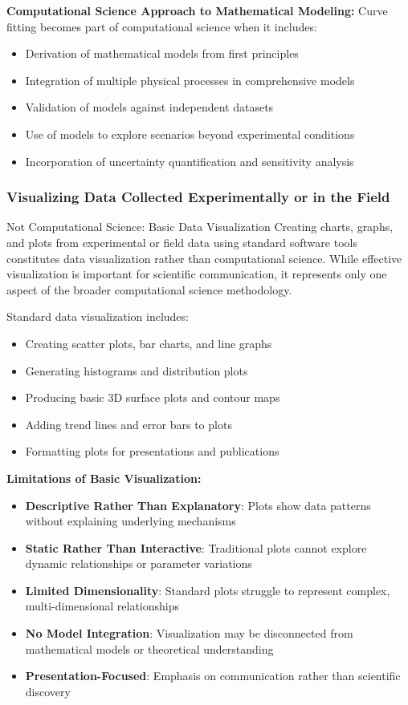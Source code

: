 \textbf{Computational Science Approach to Mathematical Modeling:}
Curve fitting becomes part of computational science when it includes:
\begin{itemize}
    \item Derivation of mathematical models from first principles
    \item Integration of multiple physical processes in comprehensive models
    \item Validation of models against independent datasets
    \item Use of models to explore scenarios beyond experimental conditions
    \item Incorporation of uncertainty quantification and sensitivity analysis
\end{itemize}

\subsubsection{Visualizing Data Collected Experimentally or in the Field}

\begin{conceptcard}{Not Computational Science: Basic Data Visualization}
Creating charts, graphs, and plots from experimental or field data using standard software tools constitutes data visualization rather than computational science. While effective visualization is important for scientific communication, it represents only one aspect of the broader computational science methodology.
\end{conceptcard}

Standard data visualization includes:
\begin{itemize}
    \item Creating scatter plots, bar charts, and line graphs
    \item Generating histograms and distribution plots
    \item Producing basic 3D surface plots and contour maps
    \item Adding trend lines and error bars to plots
    \item Formatting plots for presentations and publications
\end{itemize}

\textbf{Limitations of Basic Visualization:}
\begin{itemize}
    \item \textbf{Descriptive Rather Than Explanatory}: Plots show data patterns without explaining underlying mechanisms
    \item \textbf{Static Rather Than Interactive}: Traditional plots cannot explore dynamic relationships or parameter variations
    \item \textbf{Limited Dimensionality}: Standard plots struggle to represent complex, multi-dimensional relationships
    \item \textbf{No Model Integration}: Visualization may be disconnected from mathematical models or theoretical understanding
    \item \textbf{Presentation-Focused}: Emphasis on communication rather than scientific discovery
\end{itemize}


